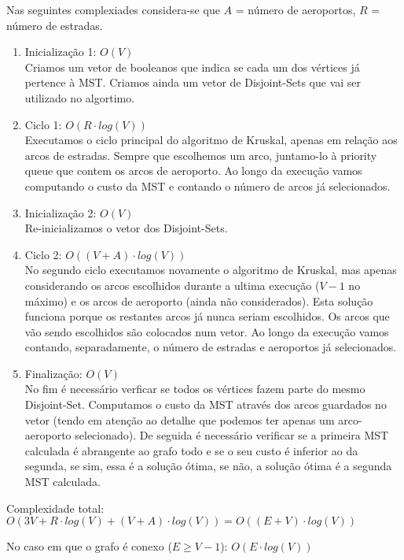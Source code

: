 \documentclass[a4paper]{article}
\begin{document}
	Nas seguintes complexiades considera-se que $A$ = número de aeroportos, $R$ = número de estradas.

	\begin{enumerate}
		\item Inicialização 1: $O(V)$\\
			Criamos um vetor de booleanos que indica se cada um dos vértices já
			pertence à MST.
			Criamos ainda um vetor de Disjoint-Sets que vai ser utilizado no algortimo.
		\item Ciclo 1: $O(R\cdot log(V))$\\
			Executamos o ciclo principal do algoritmo de Kruskal, apenas em relação
			aos arcos de estradas.
			Sempre que escolhemos um arco, juntamo-lo à priority queue que contem os arcos de aeroporto.
			Ao longo da execução vamos computando o custo da MST e contando o número
			de arcos já selecionados.
		\item Inicialização 2: $O(V)$\\
			Re-inicializamos o vetor dos Disjoint-Sets.
		\item Ciclo 2: $O( (V + A) \cdot log(V))$\\
			No segundo ciclo executamos novamente o algoritmo de Kruskal, mas apenas considerando
			os arcos escolhidos durante a ultima execução ($V-1$ no máximo) e os arcos de aeroporto (ainda não considerados).
			Esta solução funciona porque os restantes arcos já nunca seriam escolhidos.
			Os arcos que vão sendo escolhidos são colocados num vetor.
			Ao longo da execução vamos contando, separadamente, o número de estradas
			e aeroportos já selecionados.
		\item Finalização: $O(V)$\\
			No fim é necessário verficar se todos os vértices fazem parte do mesmo Disjoint-Set.
			Computamos o custo da MST através dos arcos guardados no vetor (tendo em atenção
			ao detalhe que podemos ter apenas um arco-aeroporto selecionado).
			De seguida é necessário verificar se a primeira MST calculada é abrangente ao grafo todo
			e se o seu custo é inferior ao da segunda, se sim, essa é a solução ótima, se não, a solução
			ótima é a segunda MST calculada.
	\end{enumerate}

	Complexidade total: $O(3V + R\cdot log(V) + (V+A)\cdot log(V)) = O((E+V)\cdot log(V))$

	No caso em que o grafo é conexo ($E \geq V-1$): $O(E\cdot log(V))$
\end{document}
